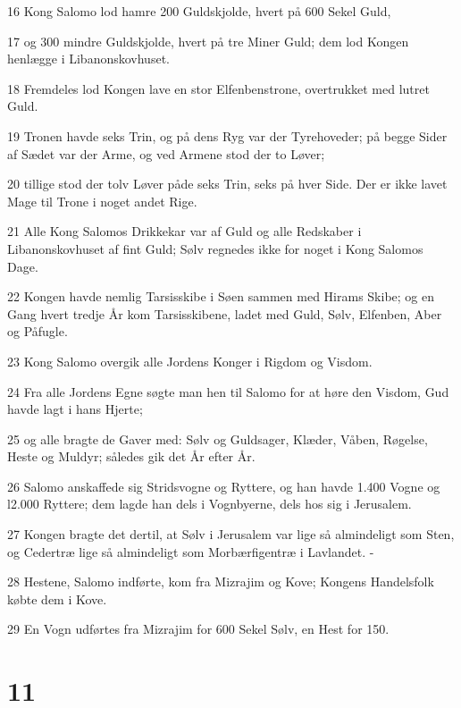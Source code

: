 \par 16 Kong Salomo lod hamre 200 Guldskjolde, hvert på 600 Sekel Guld,
\par 17 og 300 mindre Guldskjolde, hvert på tre Miner Guld; dem lod Kongen henlægge i Libanonskovhuset.
\par 18 Fremdeles lod Kongen lave en stor Elfenbenstrone, overtrukket med lutret Guld.
\par 19 Tronen havde seks Trin, og på dens Ryg var der Tyrehoveder; på begge Sider af Sædet var der Arme, og ved Armene stod der to Løver;
\par 20 tillige stod der tolv Løver påde seks Trin, seks på hver Side. Der er ikke lavet Mage til Trone i noget andet Rige.
\par 21 Alle Kong Salomos Drikkekar var af Guld og alle Redskaber i Libanonskovhuset af fint Guld; Sølv regnedes ikke for noget i Kong Salomos Dage.
\par 22 Kongen havde nemlig Tarsisskibe i Søen sammen med Hirams Skibe; og en Gang hvert tredje År kom Tarsisskibene, ladet med Guld, Sølv, Elfenben, Aber og Påfugle.
\par 23 Kong Salomo overgik alle Jordens Konger i Rigdom og Visdom.
\par 24 Fra alle Jordens Egne søgte man hen til Salomo for at høre den Visdom, Gud havde lagt i hans Hjerte;
\par 25 og alle bragte de Gaver med: Sølv og Guldsager, Klæder, Våben, Røgelse, Heste og Muldyr; således gik det År efter År.
\par 26 Salomo anskaffede sig Stridsvogne og Ryttere, og han havde 1.400 Vogne og l2.000 Ryttere; dem lagde han dels i Vognbyerne, dels hos sig i Jerusalem.
\par 27 Kongen bragte det dertil, at Sølv i Jerusalem var lige så almindeligt som Sten, og Cedertræ lige så almindeligt som Morbærfigentræ i Lavlandet. -
\par 28 Hestene, Salomo indførte, kom fra Mizrajim og Kove; Kongens Handelsfolk købte dem i Kove.
\par 29 En Vogn udførtes fra Mizrajim for 600 Sekel Sølv, en Hest for 150.

\chapter{11}

